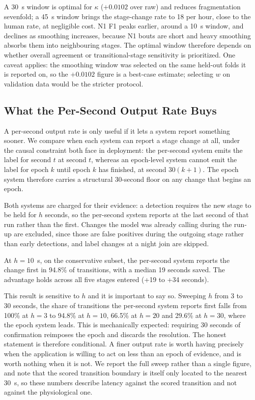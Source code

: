 \documentclass[conference]{IEEEtran}
\begin{document}
A 30~s window is optimal for $\kappa$ ($+0.0102$ over raw) and reduces fragmentation sevenfold; a 45~s
window brings the stage-change rate to 18 per hour, close to the human rate, at negligible cost. N1 F1
peaks earlier, around a 10~s window, and declines as smoothing increases, because N1 bouts are short and
heavy smoothing absorbs them into neighbouring stages. The optimal window therefore depends on whether
overall agreement or transitional-stage sensitivity is prioritized. One caveat applies: the smoothing
window was selected on the same held-out folds it is reported on, so the $+0.0102$ figure is a best-case
estimate; selecting $w$ on validation data would be the stricter protocol.

\subsection{What the Per-Second Output Rate Buys}
\label{sec:boundary}

A per-second output rate is only useful if it lets a system report something sooner. We compare when each
system can report a stage change at all, under the causal constraint both face in deployment: the
per-second system emits the label for second $t$ at second $t$, whereas an epoch-level system cannot emit
the label for epoch $k$ until epoch $k$ has finished, at second $30(k+1)$. The epoch system therefore
carries a structural 30-second floor on any change that begins an epoch.

Both systems are charged for their evidence: a detection requires the new stage to be held for $h$
seconds, so the per-second system reports at the last second of that run rather than the first. Changes
the model was already calling during the run-up are excluded, since those are false positives during the
outgoing stage rather than early detections, and label changes at a night join are skipped.

At $h = 10$~s, on the conservative subset, the per-second system reports the change first in 94.8\% of
transitions, with a median 19 seconds saved. The advantage holds across all five stages entered (+19 to
+34 seconds).

This result is sensitive to $h$ and it is important to say so. Sweeping $h$ from 3 to 30 seconds, the
share of transitions the per-second system reports first falls from 100\% at $h = 3$ to 94.8\% at
$h = 10$, 66.5\% at $h = 20$ and 29.6\% at $h = 30$, where the epoch system leads. This is mechanically
expected: requiring 30 seconds of confirmation reimposes the epoch and discards the resolution. The
honest statement is therefore conditional. A finer output rate is worth having precisely when the
application is willing to act on less than an epoch of evidence, and is worth nothing when it is not. We
report the full sweep rather than a single figure, and note that the scored transition boundary is itself
only located to the nearest 30~s, so these numbers describe latency against the scored transition and not
against the physiological one.
\end{document}
